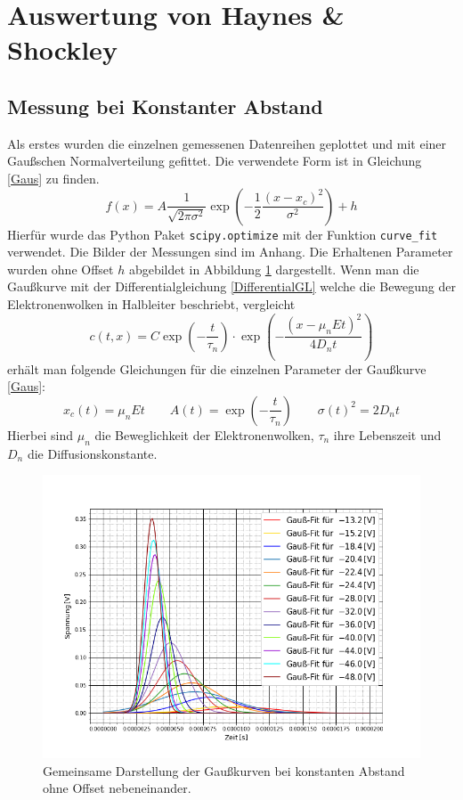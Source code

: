 \section{Auswertung von Haynes \& Shockley}
\subsection{Messung bei Konstanter Abstand}
	Als erstes wurden die einzelnen gemessenen Datenreihen geplottet und mit einer Gaußschen Normalverteilung gefittet. Die verwendete Form ist in Gleichung \ref{Gaus} zu finden.
	\begin{equation}
		f(x) = A \frac{1}{\sqrt{2\pi \sigma^2}} 	\exp\left(-\frac{1}{2}\frac{(x-x_c)^2}{\sigma^2}\right)+h
		\label{Gaus}
	\end{equation}
	Hierfür wurde das Python Paket \verb|scipy.optimize| mit der Funktion \verb|curve_fit| verwendet. Die Bilder der Messungen sind im Anhang.
	Die Erhaltenen Parameter wurden ohne Offset $h$ abgebildet in Abbildung \ref{SpannungGaus} dargestellt.	Wenn man die Gaußkurve mit der Differentialgleichung \ref{DifferentialGL} welche die Bewegung der Elektronenwolken in Halbleiter beschriebt, vergleicht
	\begin{equation}
		c(t,x)=C\exp\left(-\frac{t}{\tau_n}\right)\cdot\exp\left(-\frac{(x-\mu_nEt	)^2}{4D_nt}\right)
		\label{DifferentialGL}
	\end{equation}
	erhält man folgende Gleichungen für die einzelnen Parameter der Gaußkurve \ref{Gaus}:
	\begin{equation}
		x_c(t)=\mu_nEt \qquad A(t)=\exp\left(-\frac{t}{\tau_n}\right) \qquad \sigma(t)^2=2D_nt
	\end{equation}
	Hierbei sind $\mu_n$ die Beweglichkeit der Elektronenwolken, $\tau_n$ ihre Lebenszeit und $D_n$ die Diffusionskonstante.\par
	\FloatBarrier
	\begin{figure}[ht]
		\includegraphics[scale=0.45]{Bild/V2Abstand1}
		\centering
		\caption[Darstellung der Gaußkurven bei konst. Abstand]{Gemeinsame Darstellung der Gaußkurven bei konstanten Abstand ohne Offset nebeneinander.}
		\label{SpannungGaus}
	\end{figure}
